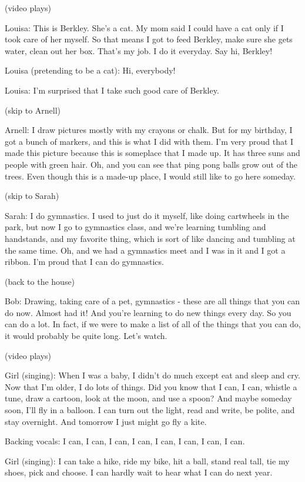 (video plays)

Louisa: This is Berkley. She's a cat. My mom said I could have a cat only if I took care of her myself. So that means I got to feed Berkley, make sure she gets water, clean out her box. That's my job. I do it everyday. Say hi, Berkley!

Louisa (pretending to be a cat): Hi, everybody!

Louisa: I'm surprised that I take such good care of Berkley.

(skip to Arnell)

Arnell: I draw pictures mostly with my crayons or chalk. But for my birthday, I got a bunch of markers, and this is what I did with them. I'm very proud that I made this picture because this is someplace that I made up. It has three suns and people with green hair. Oh, and you can see that ping pong balls grow out of the trees. Even though this is a made-up place, I would still like to go here someday.

(skip to Sarah)

Sarah: I do gymnastics. I used to just do it myself, like doing cartwheels in the park, but now I go to gymnastics class, and we're learning tumbling and handstands, and my favorite thing, which is sort of like dancing and tumbling at the same time. Oh, and we had a gymnastics meet and I was in it and I got a ribbon. I'm proud that I can do gymnastics.

(back to the house)

Bob: Drawing, taking care of a pet, gymnastics - these are all things that you can do now. Almost had it! And you're learning to do new things every day. So you can do a lot. In fact, if we were to make a list of all of the things that you can do, it would probably be quite long. Let's watch.

(video plays)

Girl (singing): When I was a baby, I didn't do much except eat and sleep and cry. Now that I'm older, I do lots of things. Did you know that I can, I can, whistle a tune, draw a cartoon, look at the moon, and use a spoon? And maybe someday soon, I'll fly in a balloon. I can turn out the light, read and write, be polite, and stay overnight. And tomorrow I just might go fly a kite.

Backing vocals: I can, I can, I can, I can, I can, I can, I can, I can.

Girl (singing): I can take a hike, ride my bike, hit a ball, stand real tall, tie my shoes, pick and choose. I can hardly wait to hear what I can do next year.

